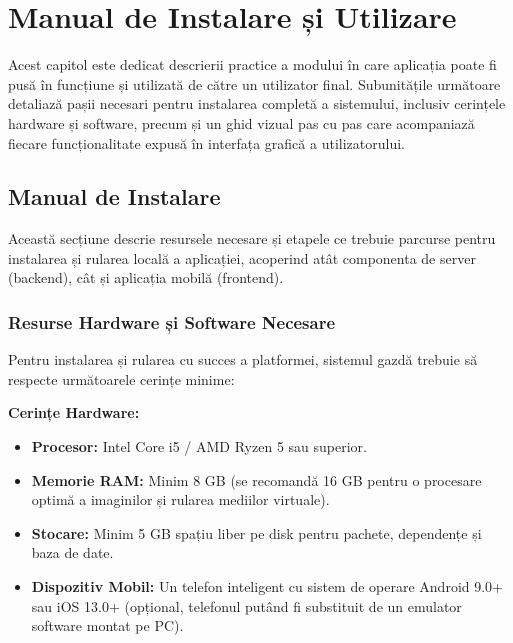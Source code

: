 \chapter{Manual de Instalare și Utilizare}
\label{cap:manual}

Acest capitol este dedicat descrierii practice a modului în care aplicația poate fi pusă în funcțiune și utilizată de către un utilizator final. Subunitățile următoare detaliază pașii necesari pentru instalarea completă a sistemului, inclusiv cerințele hardware și software, precum și un ghid vizual pas cu pas care acompaniază fiecare funcționalitate expusă în interfața grafică a utilizatorului.

\section{Manual de Instalare}

Această secțiune descrie resursele necesare și etapele ce trebuie parcurse pentru instalarea și rularea locală a aplicației, acoperind atât componenta de server (backend), cât și aplicația mobilă (frontend).

\subsection{Resurse Hardware și Software Necesare}

Pentru instalarea și rularea cu succes a platformei, sistemul gazdă trebuie să respecte următoarele cerințe minime:

\textbf{Cerințe Hardware:}
\begin{itemize}
    \item \textbf{Procesor:} Intel Core i5 / AMD Ryzen 5 sau superior.
    \item \textbf{Memorie RAM:} Minim 8 GB (se recomandă 16 GB pentru o procesare optimă a imaginilor și rularea mediilor virtuale).
    \item \textbf{Stocare:} Minim 5 GB spațiu liber pe disk pentru pachete, dependențe și baza de date.
    \item \textbf{Dispozitiv Mobil:} Un telefon inteligent cu sistem de operare Android 9.0+ sau iOS 13.0+ (opțional, telefonul putând fi substituit de un emulator software montat pe PC).
\end{itemize}

